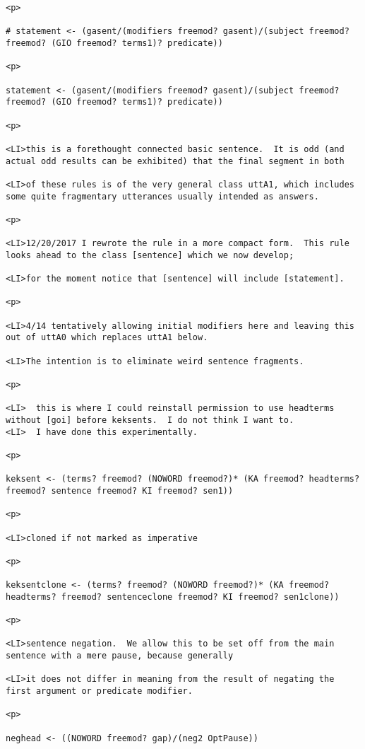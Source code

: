 \documentclass[12pt]{article}
\begin{document}
\begin{lstlisting}
<p>

# statement <- (gasent/(modifiers freemod? gasent)/(subject freemod? freemod? (GIO freemod? terms1)? predicate))

<p>

statement <- (gasent/(modifiers freemod? gasent)/(subject freemod? freemod? (GIO freemod? terms1)? predicate))

<p>

<LI>this is a forethought connected basic sentence.  It is odd (and actual odd results can be exhibited) that the final segment in both

<LI>of these rules is of the very general class uttA1, which includes some quite fragmentary utterances usually intended as answers.

<p>

<LI>12/20/2017 I rewrote the rule in a more compact form.  This rule looks ahead to the class [sentence] which we now develop;

<LI>for the moment notice that [sentence] will include [statement].

<p>

<LI>4/14 tentatively allowing initial modifiers here and leaving this out of uttA0 which replaces uttA1 below.

<LI>The intention is to eliminate weird sentence fragments.

<p>

<LI>  this is where I could reinstall permission to use headterms without [goi] before keksents.  I do not think I want to.
<LI>  I have done this experimentally.

<p>

keksent <- (terms? freemod? (NOWORD freemod?)* (KA freemod? headterms? freemod? sentence freemod? KI freemod? sen1))

<p>

<LI>cloned if not marked as imperative

<p>

keksentclone <- (terms? freemod? (NOWORD freemod?)* (KA freemod? headterms? freemod? sentenceclone freemod? KI freemod? sen1clone))

<p>

<LI>sentence negation.  We allow this to be set off from the main sentence with a mere pause, because generally

<LI>it does not differ in meaning from the result of negating the first argument or predicate modifier.

<p>

neghead <- ((NOWORD freemod? gap)/(neg2 OptPause))


\end{lstlisting}
\end{document}
